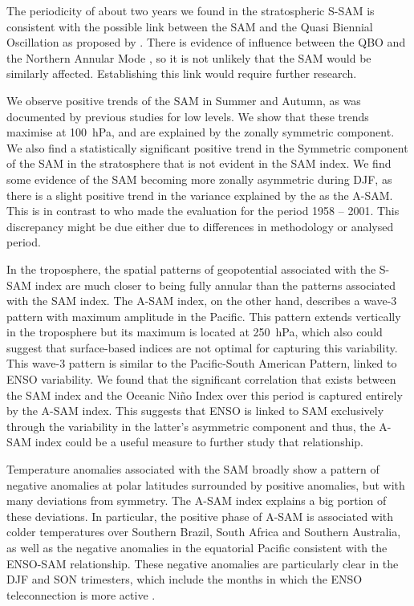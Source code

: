 \documentclass[smallextended]{svjour3}       %
\begin{document}
The periodicity of about two years we found in the stratospheric S\nobreakdash-SAM is consistent with the possible link between the SAM and the Quasi Biennial Oscillation as proposed by \citep{vasconcellos2020}.
There is evidence of influence between the QBO and the Northern Annular Mode \citep[e.g.][]{holton1980, watson2014, zhang2020}, so it is not unlikely that the SAM would be similarly affected.
Establishing this link would require further research.

We observe positive trends of the SAM in Summer and Autumn, as was documented by previous studies \citep[e.g.][ and references therein]{fogt2020} for low levels.
We show that these trends maximise at 100~hPa, and are explained by the zonally symmetric component.
We also find a statistically significant positive trend in the Symmetric component of the SAM in the stratosphere that is not evident in the SAM index.
We find some evidence of the SAM becoming more zonally asymmetric during DJF, as there is a slight positive trend in the variance explained by the as the A\nobreakdash-SAM.
This is in contrast to \citet{fogt2012} who made the evaluation for the period 1958 -- 2001.
This discrepancy might be due either due to differences in methodology or analysed period.

In the troposphere, the spatial patterns of geopotential associated with the S\nobreakdash-SAM index are much closer to being fully annular than the patterns associated with the SAM index.
The A\nobreakdash-SAM index, on the other hand, describes a wave-3 pattern with maximum amplitude in the Pacific.
This pattern extends vertically in the troposphere but its maximum is located at 250~hPa, which also could suggest that surface-based indices are not optimal for capturing this variability.
This wave-3 pattern is similar to the Pacific-South American Pattern, linked to ENSO variability.
We found that the significant correlation that exists between the SAM index and the Oceanic Niño Index over this period is captured entirely by the A\nobreakdash-SAM index.
This suggests that ENSO is linked to SAM exclusively through the variability in the latter's asymmetric component and thus, the A\nobreakdash-SAM index could be a useful measure to further study that relationship.

Temperature anomalies associated with the SAM broadly show a pattern of negative anomalies at polar latitudes surrounded by positive anomalies, but with many deviations from symmetry.
The A\nobreakdash-SAM index explains a big portion of these deviations.
In particular, the positive phase of A\nobreakdash-SAM is associated with colder temperatures over Southern Brazil, South Africa and Southern Australia, as well as the negative anomalies in the equatorial Pacific consistent with the ENSO\nobreakdash-SAM relationship.
These negative anomalies are particularly clear in the DJF and SON trimesters, which include the months in which the ENSO teleconnection is more active \citep[e.g.][]{cai2020a}.
\end{document}
